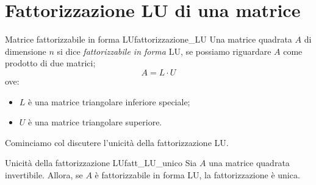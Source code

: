 \documentclass[12pt]{report}
\newcounter{definition}
\newcounter{proposition}
\newcommand{\nmu}{}
\begin{document}
\section{Fattorizzazione LU di una matrice}
\begin{definition}{\nmu Matrice fattorizzabile in forma LU}{fattorizzazione_LU}
	Una matrice quadrata $A$ di dimensione $n$ si dice \textit{fattorizzabile in forma }LU, se possiamo riguardare $A$ come prodotto di due matrici;
	\[
	A = L \cdot U
	\]
	ove:
	\begin{itemize}
		\item $L$ è una matrice triangolare inferiore speciale;
		\item $U$ è una matrice triangolare superiore.
	\end{itemize}
\end{definition}
Cominciamo col discutere l'unicità della fattorizzazione LU.
\begin{proposition}{\nmu Unicità della fattorizzazione LU}{fatt_LU_unico}
	Sia $A$ una matrice quadrata invertibile. Allora, se $A$ è fattorizzabile in forma LU, la fattorizzazione è unica.
\end{proposition}
\end{document}

